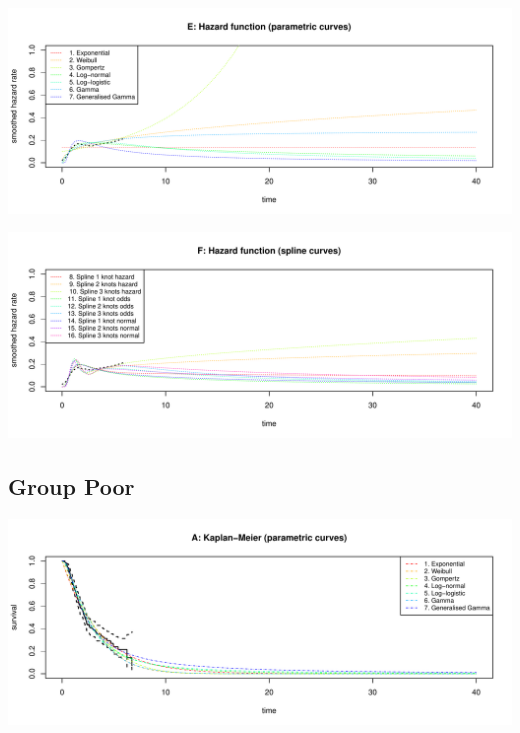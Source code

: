 \documentclass[]{article}
\begin{document}
\begin{flushleft}\includegraphics[height=0.29\textheight]{Images/validate_extrapolation2-5} \end{flushleft}

\begin{flushleft}\includegraphics[height=0.29\textheight]{Images/validate_extrapolation2-6} \end{flushleft}

\newpage

\subsection{Group Poor}\label{group-poor}

\begin{flushleft}\includegraphics[height=0.29\textheight]{Images/validate_extrapolation3-1} \end{flushleft}
\end{document}
